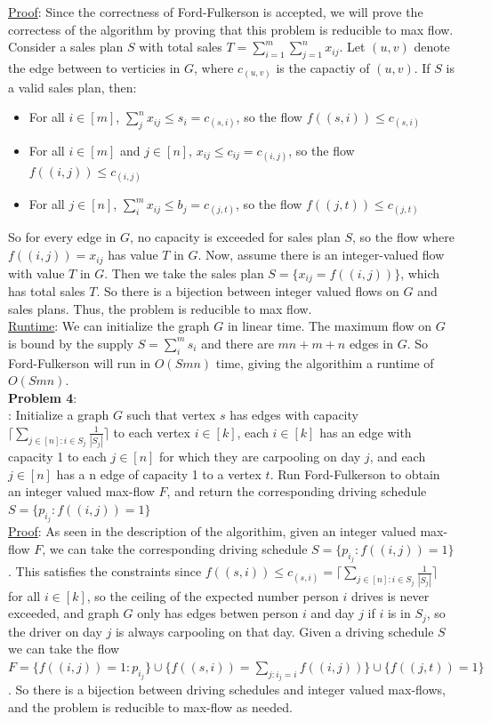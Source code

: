 \documentclass{article}
\begin{document}
\underline{Proof}: Since the correctness of Ford-Fulkerson is accepted, we will prove the correctess of the algorithm by proving that this problem is reducible to max flow. Consider a sales plan $S$ with total sales $T = \sum_{i = 1}^{m}\sum_{j = 1}^{n}x_{ij}$. Let $(u, v)$ denote the edge between to verticies in $G$, where $c_{(u, v)}$ is the capactiy of $(u, v)$. If $S$ is a valid sales plan, then: 
\begin{itemize}
    \item For all $i \in [m]$, $\sum_{j}^{n} x_{ij} \leq s_i = c_{(s, i)}$, so the flow $f((s, i)) \leq c_{(s, i)}$
    \item For all $i \in [m]$ and $j \in [n]$, $ x_{ij} \leq c_{ij} = c_{(i, j)}$, so the flow $f((i, j)) \leq c_{(i, j)}$
    \item For all $j \in [n]$, $\sum_{i}^{m} x_{ij} \leq b_j = c_{(j, t)}$, so the flow $f((j, t)) \leq c_{(j, t)}$
\end{itemize}
So for every edge in $G$, no capacity is exceeded for sales plan $S$, so the flow where $f((i, j)) = x_{ij}$ has value $T$ in $G$. Now, assume there is an integer-valued flow with value $T$ in $G$. Then we take the sales plan $S = \{x_{ij} = f((i, j))\}$, which has total sales $T$. So there is a bijection between integer valued flows on $G$ and sales plans. Thus, the problem is reducible to max flow.\\[0.5ex]
\underline{Runtime}: We can initialize the graph $G$ in linear time. The maximum flow on $G$ is bound by the supply $S = \sum_{i}^{m}s_i$ and there are $mn + m + n$ edges in $G$. So Ford-Fulkerson will run in $O(Smn)$ time, giving the algorithim a runtime of $O(Smn)$. \\[1.0ex]
\textbf{Problem 4}: \\[0.5ex]
: Initialize a graph $G$ such that vertex $s$ has edges with capacity $\lceil \sum_{j \in [n]:i\in S_j} \frac{1}{|S_j|} \rceil$ to each vertex $i \in [k]$, each $i \in [k]$ has an edge with capacity 1 to each $j \in [n]$ for which they are carpooling on day $j$, and each $j \in [n]$ has a n edge of capacity 1 to a vertex $t$. Run Ford-Fulkerson to obtain an integer valued max-flow $F$, and return the corresponding driving schedule $S = \{p_{i_j} : f((i, j)) = 1\}$ \\[0.5ex]
\underline{Proof}: As seen in the description of the algorithim, given an integer valued max-flow $F$, we can take the corresponding driving schedule $S = \{p_{i_j} : f((i, j)) = 1\}$. This satisfies the constraints since $f((s, i)) \leq c_{(s, i)} = \lceil \sum_{j \in [n]:i\in S_j} \frac{1}{|S_j|} \rceil$ for all $i \in [k]$, so the ceiling of the expected number person $i$ drives is never exceeded, and graph $G$ only has edges betwen person $i$ and day $j$ if $i$ is in $S_j$, so the driver on day $j$ is always carpooling on that day. Given a driving schedule $S$ we can take the flow $F = \{f((i, j)) = 1 : p_{i_j}\} \cup \{f((s, i)) = \sum_{j:i_j = i}f((i, j))\} \cup \{f((j, t)) = 1\}$. So there is a bijection between driving schedules and integer valued max-flows, and the problem is reducible to max-flow as needed. \\[0.25ex]
\end{document}
